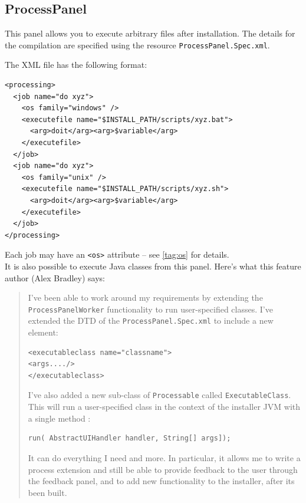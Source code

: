 \subsection{ProcessPanel}

This panel allows you to execute arbitrary files after installation.
The details for the compilation are specified using the resource \texttt{ProcessPanel.Spec.xml}.

The XML file has the following format:
\begin{verbatim}
<processing>
  <job name="do xyz">
    <os family="windows" />
    <executefile name="$INSTALL_PATH/scripts/xyz.bat">
      <arg>doit</arg><arg>$variable</arg>
    </executefile>
  </job>
  <job name="do xyz">
    <os family="unix" />
    <executefile name="$INSTALL_PATH/scripts/xyz.sh">
      <arg>doit</arg><arg>$variable</arg>
    </executefile>
  </job>
</processing>
\end{verbatim}

Each job may have an \texttt{<os>} attribute -- see \ref{tag:os} for details.\\

It is also possible to execute Java classes from this panel. Here's what this
feature author (Alex Bradley) says:
\begin{quotation}
I've been able to work around my requirements by extending the
\texttt{ProcessPanelWorker} functionality to run user-specified classes. I've
extended the DTD of the \texttt{ProcessPanel.Spec.xml} to include a new element:
\begin{verbatim}
<executableclass name="classname">
<args..../>
</executableclass>
\end{verbatim}
I've also added a new sub-class of \texttt{Processable} called
\texttt{ExecutableClass}. This will run a user-specified class in the context of
the installer JVM with a single method :
\begin{verbatim}run( AbstractUIHandler handler, String[] args]);\end{verbatim}

It can do everything I need and more. In particular, it allows me to write a
process extension and still be able to provide feedback to the user through
the feedback panel, and to add new functionality to the installer, after its
been built.
\end{quotation}
